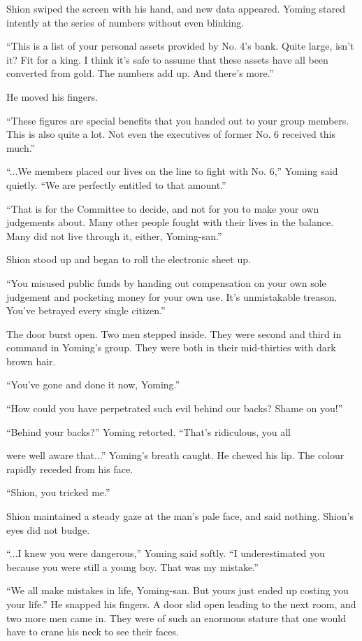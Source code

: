 Shion swiped the screen with his hand, and new data appeared. Yoming
stared intently at the series of numbers without even blinking.

``This is a list of your personal assets provided by No. 4's bank. Quite
large, isn't it? Fit for a king. I think it's safe to assume that these
assets have all been converted from gold. The numbers add up. And
there's more.''

He moved his fingers.

``These figures are special benefits that you handed out to your group
members. This is also quite a lot. Not even the executives of former No.
6 received this much.''

``...We members placed our lives on the line to fight with No. 6,''
Yoming said quietly. ``We are perfectly entitled to that amount.''

``That is for the Committee to decide, and not for you to make your own
judgements about. Many other people fought with their lives in the
balance. Many did not live through it, either, Yoming-san.''

Shion stood up and began to roll the electronic sheet up.

``You misused public funds by handing out compensation on your own sole
judgement and pocketing money for your own use. It's unmistakable
treason. You've betrayed every single citizen.''

The door burst open. Two men stepped inside. They were second and third
in command in Yoming's group. They were both in their mid-thirties with
dark brown hair.

``You've gone and done it now, Yoming.''

``How could you have perpetrated such evil behind our backs? Shame on
you!''

``Behind your backs?'' Yoming retorted. ``That's ridiculous, you all~

were well aware that...'' Yoming's breath caught. He chewed his lip. The
colour rapidly receded from his face.

``Shion, you tricked me.''

Shion maintained a steady gaze at the man's pale face, and said nothing.
Shion's eyes did not budge.

``...I knew you were dangerous,'' Yoming said softly. ``I underestimated
you because you were still a young boy. That was my mistake.''

``We all make mistakes in life, Yoming-san. But yours just ended up
costing you your life.'' He snapped his fingers. A door slid open
leading to the next room, and two more men came in. They were of such an
enormous stature that one would have to crane his neck to see their
faces.


